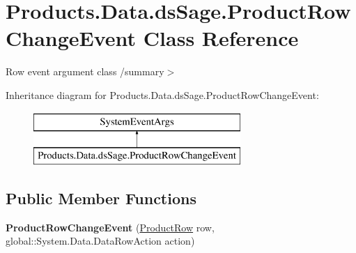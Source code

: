 \hypertarget{class_products_1_1_data_1_1ds_sage_1_1_product_row_change_event}{}\section{Products.\+Data.\+ds\+Sage.\+Product\+Row\+Change\+Event Class Reference}
\label{class_products_1_1_data_1_1ds_sage_1_1_product_row_change_event}


Row event argument class /summary$>$  


Inheritance diagram for Products.\+Data.\+ds\+Sage.\+Product\+Row\+Change\+Event\+:\begin{figure}[H]
\begin{center}
\leavevmode
\includegraphics[height=2.000000cm]{class_products_1_1_data_1_1ds_sage_1_1_product_row_change_event}
\end{center}
\end{figure}
\subsection*{Public Member Functions}
\begin{DoxyCompactItemize}
\item 
{\bfseries Product\+Row\+Change\+Event} (\hyperlink{class_products_1_1_data_1_1ds_sage_1_1_product_row}{Product\+Row} row, global\+::\+System.\+Data.\+Data\+Row\+Action action)\hypertarget{class_products_1_1_data_1_1ds_sage_1_1_product_row_change_event_ad111ae7eb561a6dd3580a64f02da5795}{}\label{class_products_1_1_data_1_1ds_sage_1_1_product_row_change_event_ad111ae7eb561a6dd3580a64f02da5795}

\end{DoxyCompactItemize}
